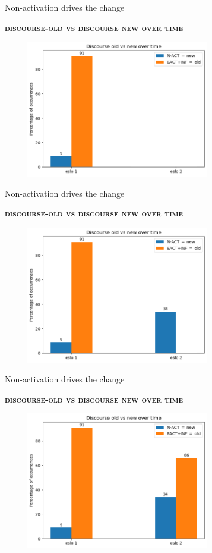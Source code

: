 \documentclass[lesson_slides]{subfiles}
\begin{document}
\begin{frame}[c]{Non-activation drives the change}

    \textbf{\textsc{discourse-old vs discourse new over time}}
    \begin{center}
        \includegraphics[width=10cm, height=6cm]{images/oldnew2.png}
    \end{center}
  
\end{frame}
\begin{frame}[c]{Non-activation drives the change}

    \textbf{\textsc{discourse-old vs discourse new over time}}
    \begin{center}
        \includegraphics[width=10cm, height=6cm]{images/oldnew3.png}
    \end{center}
  
\end{frame}
\begin{frame}[c]{Non-activation drives the change}

    \textbf{\textsc{discourse-old vs discourse new over time}}
    \begin{center}
        \includegraphics[width=10cm, height=6cm]{images/oldnewall.png}
    \end{center}
  
\end{frame}
\end{document}
